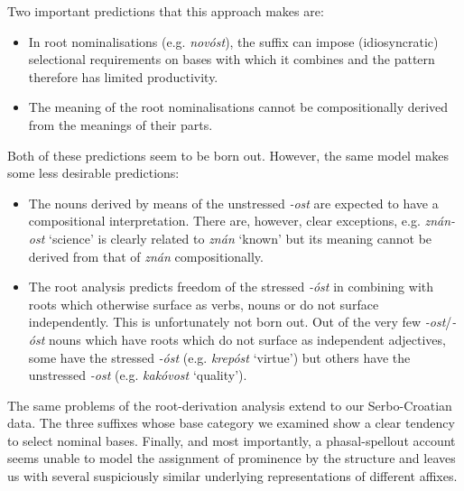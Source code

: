 \documentclass[output=paper, colorlinks, citecolor=brown, newtxmath]{langsci/langscibook}
\begin{document}
Two important predictions that this approach makes are: \begin{itemize}
\item In root nominalisations (e.g. \textit{novóst}), the suffix can impose (idiosyncratic) selectional requirements on bases with which it combines and the pattern therefore has limited productivity.
\item The meaning of the root nominalisations cannot be compositionally derived from the meanings of their parts.
\end{itemize}

Both of these predictions seem to be born out. However, the same model makes some less desirable predictions:
\begin{itemize}
\item The nouns derived by means of the unstressed \textit{-ost} are expected to have a compositional interpretation. There are, however, clear exceptions, e.g. \textit{znán-ost} `science' is clearly related to \textit{znán} `known' but its meaning cannot be derived from that of \textit{znán} compositionally.
\item The root  analysis predicts  freedom of the stressed \textit{-óst} in combining with roots which otherwise surface as verbs, nouns or do not surface independently. This is unfortunately not born out. Out of the very few \textit{-ost}/\textit{-óst} nouns which have roots which do not surface as independent adjectives, some have the stressed \textit{-óst} (e.g. \textit{krepóst} `virtue') but others have the unstressed \textit{-ost} (e.g. \textit{kakóvost} `quality').
\end{itemize}

The same problems of the root-derivation analysis extend to our Serbo-Cro\-a\-tian data. The three  suffixes whose base category we examined show a clear tendency to select nominal bases. Finally, and most importantly, a phasal-spellout account seems unable to model the assignment of prominence by the structure and leaves us with several suspiciously similar underlying representations of different affixes.
\end{document}
